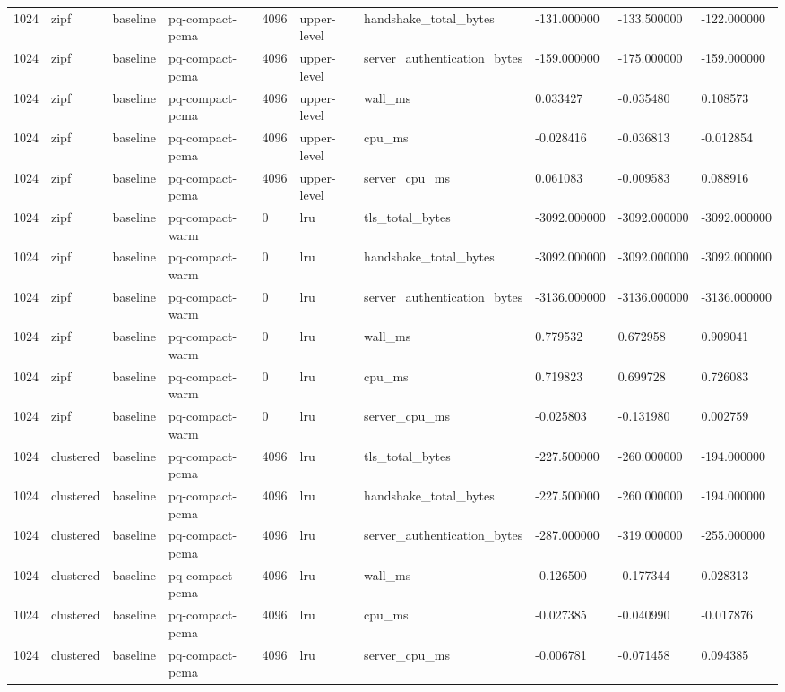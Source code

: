 \begin{tabular}{llllllllll}
1024 & zipf & baseline & pq-compact-pcma & 4096 & upper-level & handshake\_total\_bytes & -131.000000 & -133.500000 & -122.000000 \\
1024 & zipf & baseline & pq-compact-pcma & 4096 & upper-level & server\_authentication\_bytes & -159.000000 & -175.000000 & -159.000000 \\
1024 & zipf & baseline & pq-compact-pcma & 4096 & upper-level & wall\_ms & 0.033427 & -0.035480 & 0.108573 \\
1024 & zipf & baseline & pq-compact-pcma & 4096 & upper-level & cpu\_ms & -0.028416 & -0.036813 & -0.012854 \\
1024 & zipf & baseline & pq-compact-pcma & 4096 & upper-level & server\_cpu\_ms & 0.061083 & -0.009583 & 0.088916 \\
1024 & zipf & baseline & pq-compact-warm & 0 & lru & tls\_total\_bytes & -3092.000000 & -3092.000000 & -3092.000000 \\
1024 & zipf & baseline & pq-compact-warm & 0 & lru & handshake\_total\_bytes & -3092.000000 & -3092.000000 & -3092.000000 \\
1024 & zipf & baseline & pq-compact-warm & 0 & lru & server\_authentication\_bytes & -3136.000000 & -3136.000000 & -3136.000000 \\
1024 & zipf & baseline & pq-compact-warm & 0 & lru & wall\_ms & 0.779532 & 0.672958 & 0.909041 \\
1024 & zipf & baseline & pq-compact-warm & 0 & lru & cpu\_ms & 0.719823 & 0.699728 & 0.726083 \\
1024 & zipf & baseline & pq-compact-warm & 0 & lru & server\_cpu\_ms & -0.025803 & -0.131980 & 0.002759 \\
1024 & clustered & baseline & pq-compact-pcma & 4096 & lru & tls\_total\_bytes & -227.500000 & -260.000000 & -194.000000 \\
1024 & clustered & baseline & pq-compact-pcma & 4096 & lru & handshake\_total\_bytes & -227.500000 & -260.000000 & -194.000000 \\
1024 & clustered & baseline & pq-compact-pcma & 4096 & lru & server\_authentication\_bytes & -287.000000 & -319.000000 & -255.000000 \\
1024 & clustered & baseline & pq-compact-pcma & 4096 & lru & wall\_ms & -0.126500 & -0.177344 & 0.028313 \\
1024 & clustered & baseline & pq-compact-pcma & 4096 & lru & cpu\_ms & -0.027385 & -0.040990 & -0.017876 \\
1024 & clustered & baseline & pq-compact-pcma & 4096 & lru & server\_cpu\_ms & -0.006781 & -0.071458 & 0.094385 \\

\end{tabular}
